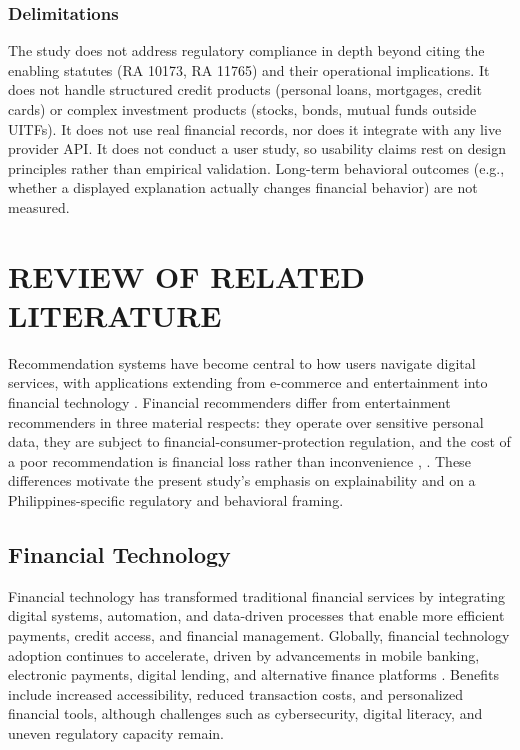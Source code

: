 \documentclass[journal]{./IEEE/IEEEtran}
\begin{document}
\subsubsection{Delimitations}

The study does not address regulatory compliance in depth beyond citing the enabling statutes (RA 10173, RA 11765) and their operational implications. It does not handle structured credit products (personal loans, mortgages, credit cards) or complex investment products (stocks, bonds, mutual funds outside UITFs). It does not use real financial records, nor does it integrate with any live provider API. It does not conduct a user study, so usability claims rest on design principles rather than empirical validation. Long-term behavioral outcomes (e.g., whether a displayed explanation actually changes financial behavior) are not measured.

\section{REVIEW OF RELATED LITERATURE}
Recommendation systems have become central to how users navigate digital services, with applications extending from e-commerce and entertainment into financial technology \cite{ref13}. Financial recommenders differ from entertainment recommenders in three material respects: they operate over sensitive personal data, they are subject to financial-consumer-protection regulation, and the cost of a poor recommendation is financial loss rather than inconvenience \cite{ref13}, \cite{ref14}. These differences motivate the present study's emphasis on explainability and on a Philippines-specific regulatory and behavioral framing.

\subsection{Financial Technology}
Financial technology has transformed traditional financial services by integrating digital systems, automation, and data-driven processes that enable more efficient payments, credit access, and financial management. Globally, financial technology adoption continues to accelerate, driven by advancements in mobile banking, electronic payments, digital lending, and alternative finance platforms \cite{ref9}. Benefits include increased accessibility, reduced transaction costs, and personalized financial tools, although challenges such as cybersecurity, digital literacy, and uneven regulatory capacity remain.
\end{document}
